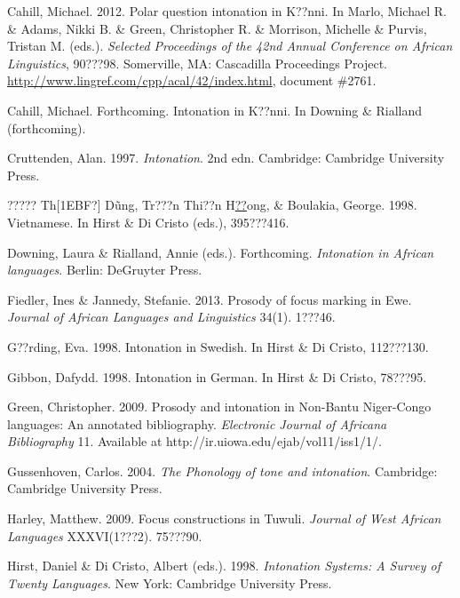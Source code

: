 \documentclass[output=paper]{langsci/langscibook}
\begin{document}
Cahill, Michael. 2012. Polar question intonation in K??nni. In Marlo, Michael R. \& Adams, Nikki B. \& Green, Christopher R. \& Morrison, Michelle \& Purvis,\emph{ }Tristan M. (eds.). \emph{Selected Proceedings of the 42nd Annual Conference on African Linguistics}, 90???98. Somerville, MA: Cascadilla Proceedings Project. \url{http://www.lingref.com/cpp/acal/42/index.html}, document \#2761.



Cahill, Michael. Forthcoming. Intonation in K??nni. In Downing \& Rialland (forthcoming).



Cruttenden, Alan. 1997. \emph{Intonation}. 2nd edn. Cambridge: Cambridge University Press.



????? Th[1EBF?] D\~{u}ng, Tr???n Thi??n H\href{http://en.wikipedia.org/wiki/??}{??}ong, \& Boulakia, George. 1998. Vietnamese. In Hirst \& Di Cristo (eds.), 395???416.



Downing, Laura \& Rialland, Annie (eds.). Forthcoming. \emph{Intonation in African languages}. Berlin: DeGruyter Press.



Fiedler, Ines \& Jannedy, Stefanie. 2013. Prosody of focus marking in Ewe. \emph{Journal of African Languages and Linguistics}\textit{ }34(1). 1???46.



G??rding, Eva. 1998. Intonation in Swedish. In Hirst \& Di Cristo, 112???130. 



Gibbon, Dafydd. 1998. Intonation in German. In Hirst \& Di Cristo, 78???95.



Green, Christopher. 2009. Prosody and intonation in Non-Bantu Niger-Congo languages: An annotated bibliography. \emph{Electronic Journal of Africana Bibliography} 11. Available at http://ir.uiowa.edu/ejab/vol11/iss1/1/.



Gussenhoven, Carlos. 2004. \emph{The Phonology of tone and intonation}. Cambridge: Cambridge University Press.



Harley, Matthew. 2009. Focus constructions in Tuwuli. \emph{Journal of West African Languages} XXXVI(1???2). 75???90.



Hirst, Daniel \& Di Cristo, Albert (eds.). 1998. \emph{Intonation Systems: A Survey of Twenty Languages}. New York: Cambridge University Press.
\end{document}
